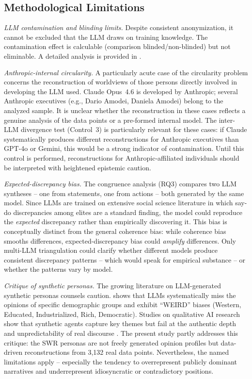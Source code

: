 \documentclass[12pt,a4paper]{article}
\begin{document}
\subsection{Methodological Limitations}

\emph{LLM contamination and blinding limits.} Despite consistent anonymization, it cannot be excluded that the LLM draws on training knowledge. The contamination effect is calculable (comparison blinded/non-blinded) but not eliminable. A detailed analysis is provided in \citet{Geiger2026SWR}.

\emph{Anthropic-internal circularity.} A particularly acute case of the circularity problem concerns the reconstruction of worldviews of those persons directly involved in developing the LLM used. Claude Opus~4.6 is developed by Anthropic; several Anthropic executives (e.g., Dario Amodei, Daniela Amodei) belong to the analyzed sample. It is unclear whether the reconstruction in these cases reflects a genuine analysis of the data points or a pre-formed internal model. The inter-LLM divergence test (Control~3) is particularly relevant for these cases: if Claude systematically produces different reconstructions for Anthropic executives than GPT-4o or Gemini, this would be a strong indicator of contamination. Until this control is performed, reconstructions for Anthropic-affiliated individuals should be interpreted with heightened epistemic caution.

\emph{Expected-discrepancy bias.} The congruence analysis (RQ3) compares two LLM syntheses -- one from statements, one from actions -- both generated by the same model. Since LLMs are trained on extensive social science literature in which say-do discrepancies among elites are a standard finding, the model could reproduce the \emph{expected} discrepancy rather than empirically discovering it. This bias is conceptually distinct from the general coherence bias: while coherence bias smooths differences, expected-discrepancy bias could \emph{amplify} differences. Only multi-LLM triangulation could clarify whether different models produce consistent discrepancy patterns -- which would speak for empirical substance -- or whether the patterns vary by model.

\emph{Critique of synthetic personas.} The growing literature on LLM-generated synthetic personas counsels caution. \citet{Santurkar2023} shows that LLMs systematically miss the opinions of specific demographic groups and exhibit ``WEIRD'' biases (Western, Educated, Industrialized, Rich, Democratic). Studies on qualitative AI research show that synthetic agents capture key themes but fail at the authentic depth and unpredictability of real discourse \citep{Argyle2023}. The present study partly addresses this critique: the SWR personas are not freely generated opinion profiles but data-driven reconstructions from 3,132 real data points. Nevertheless, the named limitations apply -- especially the tendency to overrepresent publicly dominant narratives and underrepresent idiosyncratic or contradictory positions.
\end{document}
